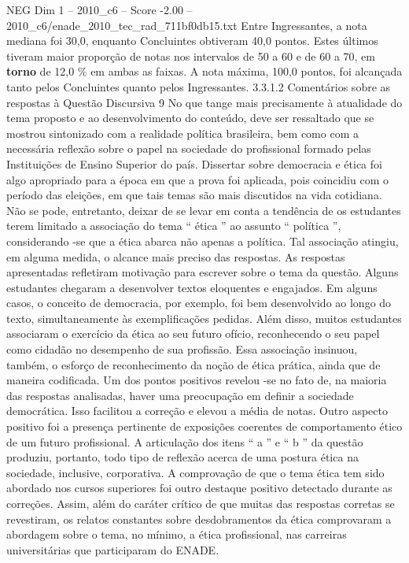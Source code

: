 \begin{textsample}{NEG Dim 1 – 2010\_c6 – Score -2.00 – 2010\_c6/enade\_2010\_tec\_rad\_711bf0db15.txt}
Entre Ingressantes, a nota mediana foi 30,0, enquanto Concluintes obtiveram 40,0 pontos.
Estes últimos tiveram maior proporção de notas nos intervalos de 50 a 60 e de 60 a 70, em \textbf{torno} de 12,0 \% em ambas as faixas.
A nota máxima, 100,0 pontos, foi alcançada tanto pelos Concluintes quanto pelos Ingressantes. 3.3.1.2 Comentários sobre as respostas à Questão Discursiva 9 No que tange mais precisamente à atualidade do tema proposto e ao desenvolvimento do conteúdo, deve ser ressaltado que se mostrou sintonizado com a realidade política brasileira, bem como com a necessária reflexão sobre o papel na sociedade do profissional formado pelas Instituições de Ensino Superior do país.
Dissertar sobre democracia e ética foi algo apropriado para a época em que a prova foi aplicada, pois coincidiu com o período das eleições, em que tais temas são mais discutidos na vida cotidiana.
Não se pode, entretanto, deixar de se levar em conta a tendência de os estudantes terem limitado a associação do tema “ ética ” ao assunto “ política ”, considerando -se que a ética abarca não apenas a política.
Tal associação atingiu, em alguma medida, o alcance mais preciso das respostas.
As respostas apresentadas refletiram motivação para escrever sobre o tema da questão.
Alguns estudantes chegaram a desenvolver textos eloquentes e engajados.
Em alguns casos, o conceito de democracia, por exemplo, foi bem desenvolvido ao longo do texto, simultaneamente às exemplificações pedidas.
Além disso, muitos estudantes associaram o exercício da ética ao seu futuro ofício, reconhecendo o seu papel como cidadão no desempenho de sua profissão.
Essa associação insinuou, também, o esforço de reconhecimento da noção de ética prática, ainda que de maneira codificada.
Um dos pontos positivos revelou -se no fato de, na maioria das respostas analisadas, haver uma preocupação em definir a sociedade democrática.
Isso facilitou a correção e elevou a média de notas.
Outro aspecto positivo foi a presença pertinente de exposições coerentes de comportamento ético de um futuro profissional.
A articulação dos itens “ a ” e “ b ” da questão produziu, portanto, todo tipo de reflexão acerca de uma postura ética na sociedade, inclusive, corporativa.
A comprovação de que o tema ética tem sido abordado nos cursos superiores foi outro destaque positivo detectado durante as correções.
Assim, além do caráter crítico de que muitas das respostas corretas se revestiram, os relatos constantes sobre desdobramentos da ética comprovaram a abordagem sobre o tema, no mínimo, a ética profissional, nas carreiras universitárias que participaram do ENADE.

\end{textsample}
